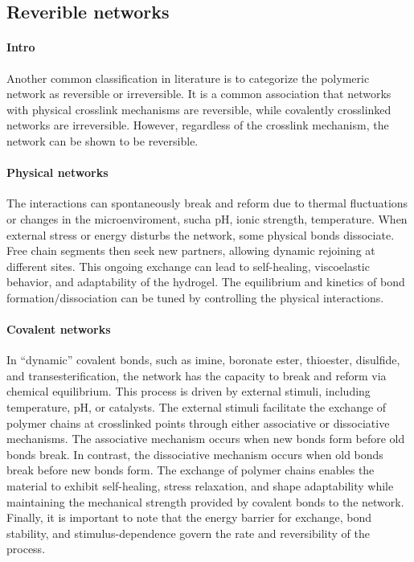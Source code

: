 \subsection{Reverible networks}

\paragraph{Intro} Another common classification in literature is to categorize the polymeric network as reversible or irreversible.
It is a common association that networks with physical crosslink mechanisms are reversible, while covalently crosslinked networks are irreversible.
However, regardless of the crosslink mechanism, the network can be shown to be reversible.

\paragraph{Physical networks} The interactions can spontaneously break and reform due to thermal fluctuations or changes in the microenviroment, sucha pH, ionic strength, temperature.
When external stress or energy disturbs the network, some physical bonds dissociate. 
Free chain segments then seek new partners, allowing dynamic rejoining at different sites. 
This ongoing exchange can lead to self-healing, viscoelastic behavior, and adaptability of the hydrogel.
The equilibrium and kinetics of bond formation/dissociation can be tuned by controlling the physical interactions.

\paragraph{Covalent networks} In ``dynamic'' covalent bonds, such as imine, boronate ester, thioester, disulfide, and transesterification, the network has the capacity to break and reform via chemical equilibrium. 
This process is driven by external stimuli, including temperature, pH, or catalysts.
The external stimuli facilitate the exchange of polymer chains at crosslinked points through either associative or dissociative mechanisms.
The associative mechanism occurs when new bonds form before old bonds break. In contrast, the dissociative mechanism occurs when old bonds break before new bonds form.
The exchange of polymer chains enables the material to exhibit self-healing, stress relaxation, and shape adaptability while maintaining the mechanical strength provided by covalent bonds to the network.
Finally, it is important to note that the energy barrier for exchange, bond stability, and stimulus-dependence govern the rate and reversibility of the process.


